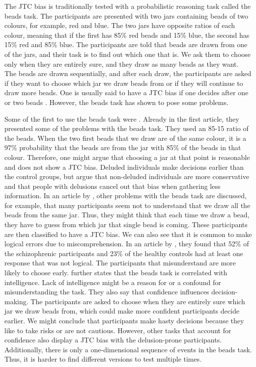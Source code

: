 The JTC bias is traditionally tested with a probabilistic reasoning task called the beads task. The participants are presented with two jars containing beads of two colours, for example, red and blue. The two jars have opposite ratios of each colour, meaning that if the first has 85\% red beads and 15\% blue, the second has 15\% red and 85\% blue. The participants are told that beads are drawn from one of the jars, and their task is to find out which one that is.  We ask them to choose only when they are entirely sure, and they draw as many beads as they want. The beads are drawn sequentially, and after each draw, the participants are asked if they want to choose which jar we draw beads from or if they will continue to draw more beads. One is usually said to have a JTC bias if one decides after one or two beads \citep{moritz2017}. However, the beads task has shown to pose some problems.

Some of the first to use the beads task were \citet{huq1988}. Already in the first article, they presented some of the problems with the beads task. They used an 85-15 ratio of the beads. When the two first beads that we draw are of the same colour, it is a 97\% probability that the beads are from the jar with 85\% of the beads in that colour. Therefore, one might argue that choosing a jar at that point is reasonable and does not show a JTC bias. Deluded individuals make decisions earlier than the control groups, but \citeauthor{huq1988} argue that non-deluded individuals are more conservative and that people with delusions cancel out that bias when gathering less information. In an article by \citet{moritz2017}, other problems with the beads task are discussed, for example, that many participants seem not to understand that we draw all the beads from the same jar.  Thus, they might think that each time we draw a bead, they have to guess from which jar that single bead is coming. These participants are then classified to have a JTC bias. We can also see that it is common to make logical errors due to miscomprehension. In an article by \citet{moritz2005}, they found that 52\% of the schizophrenic participants and 23\% of the healthy controls had at least one response that was not logical. The participants that misunderstand are more likely to choose early. \citet{moritz2017} further states that the beads task is correlated with intelligence. Lack of intelligence might be a reason for or a confound for misunderstanding the task. They also say that confidence influences decision-making. The participants are asked to choose when they are entirely sure which jar we draw beads from, which could make more confident participants decide earlier. We might conclude that participants make hasty decisions because they like to take risks or are not cautious. However, other tasks that account for confidence also display a JTC bias with the delusion-prone participants. Additionally, there is only a one-dimensional sequence of events in the beads task. Thus, it is harder to find different versions to test multiple times.  

